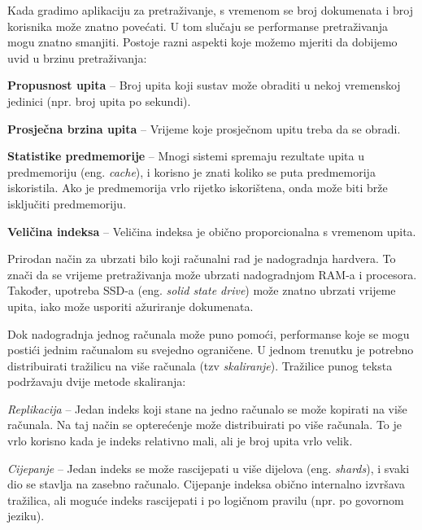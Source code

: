 \documentclass[a4paper,twoside,12pt]{scrreprt}
\begin{document}
Kada gradimo aplikaciju za pretraživanje, s vremenom se broj dokumenata i broj korisnika može znatno povećati. U tom slučaju se performanse pretraživanja mogu znatno smanjiti. Postoje razni aspekti koje možemo mjeriti da dobijemo uvid u brzinu pretraživanja:

\begin{compactitem}
  \item \textbf{Propusnost upita} – Broj upita koji sustav može obraditi u nekoj vremenskoj jedinici (npr. broj upita po sekundi).
  \item \textbf{Prosječna brzina upita} – Vrijeme koje prosječnom upitu treba da se obradi.
  \item \textbf{Statistike predmemorije} – Mnogi sistemi spremaju rezultate upita u predmemoriju (eng. \textit{cache}), i korisno je znati koliko se puta predmemorija iskoristila. Ako je predmemorija vrlo rijetko iskorištena, onda može biti brže isključiti predmemoriju.
  \item \textbf{Veličina indeksa} – Veličina indeksa je obično proporcionalna s vremenom upita.
\end{compactitem}

Prirodan način za ubrzati bilo koji računalni rad je nadogradnja hardvera. To znači da se vrijeme pretraživanja može ubrzati nadogradnjom RAM-a i procesora. Također, upotreba SSD-a (eng. \textit{solid state drive}) može znatno ubrzati vrijeme upita, iako može usporiti ažuriranje dokumenata.

Dok nadogradnja jednog računala može puno pomoći, performanse koje se mogu postići jednim računalom su svejedno ograničene. U jednom trenutku je potrebno distribuirati tražilicu na više računala (tzv \textit{skaliranje}). Tražilice punog teksta podržavaju dvije metode skaliranja:

\begin{compactenum}
  \item \textit{Replikacija} – Jedan indeks koji stane na jedno računalo se može kopirati na više računala. Na taj način se opterećenje može distribuirati po više računala. To je vrlo korisno kada je indeks relativno mali, ali je broj upita vrlo velik.
  \item \textit{Cijepanje} – Jedan indeks se može rascijepati u više dijelova (eng. \textit{shards}), i svaki dio se stavlja na zasebno računalo. Cijepanje indeksa obično internalno izvršava tražilica, ali moguće indeks rascijepati i po logičnom pravilu (npr. po govornom jeziku).
\end{compactenum}
\end{document}
